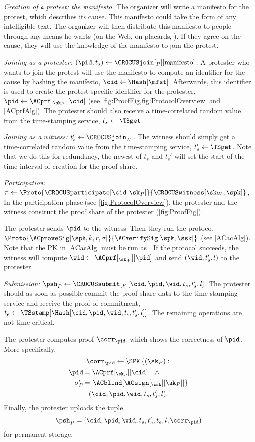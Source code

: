\emph{Creation of a protest: the manifesto.}
The organizer will write a manifesto for the protest, which describes its cause.
This manifesto could take the form of any intelligible text.
The organizer will then distribute this manifesto to people through any means he wants (\eg on the Web, on placards, \etc).
If they agree on the cause, they will use the knowledge of the manifesto to join the protest.


\emph{Joining as a protester: \((\pid, t_s)\gets 
    \CROCUSjoin[_P][\text{manifesto}]\).}
A protester who wants to join the protest will use the manifesto to compute an identifier for the cause by hashing the manifesto, \(\cid\gets \Hash[\mfst]\).
Afterwards, this identifier is used to create the protest-specific identifier 
for the protester, \(\pid\gets \ACprf[_{\sk_P}][\cid]\) (see 
\cref{fig:ProofFig,fig:ProtocolOverview} and \cref{ACprfAlg}).
The protester should also receive a time-correlated random value from the 
time-stamping service, \(t_s\gets \TSget\).


\emph{Joining as a witness: \(t_s'\gets \CROCUSjoin_W\).}
The witness should simply get a time-correlated random value from the time-stamping service, \(t_s'\gets \TSget\).
Note that we do this for redundancy, the newest of \(t_s\) and \(t_s'\) will 
set the start of the time interval of creation for the proof share.


\emph{Participation: \(\pi\gets
    \Proto{\CROCUSparticipate[\cid, \sk_P]}{\CROCUSwitness[\sk_W, \spk]}\),}
In the participation phase (see \cref{fig:ProtocolOverview}), the protester and 
the witness construct the proof share of the protester (\cref{fig:ProofFig}).

The protester sends \(\pid\) to the witness.
Then they run the protocol \(\Proto{\ACproveSig[\spk, k, r, 
    \sigma]}{\ACverifySig[\spk, \ssk]}\) (see \cref{ACacAlg}).
Note that the \ac{PK} in \cref{ACacAlg} must be run as .
If the protocol succeeds, the witness will compute \(\wid \gets 
  \ACprf[_{\sk_W}][\pid]\) and send \((\wid, t_s', l)\) to the protester.


\emph{Submission: \(\psh_P\gets \CROCUSsubmit[_P][\cid, \pid, \wid, t_s, t_s',  l]\).}
The protester should as soon as possible commit the proof-share data to the 
time-stamping service and receive the proof of commitment, \(t_e\gets 
  \TSstamp[\Hash[\cid, \pid, \wid, t_s, t_s', l]]\).
The remaining operations are not time critical.

The protester computes  proof \(\corr_{\pid}\), which shows the 
correctness of \(\pid\).
More specifically,
\begin{multline*}
  \corr_{\pid}\gets \SPK\left\{ (\sk_P) : \right. \\
    \begin{aligned}
      \pid &= \ACprf[_{\sk_P}][\cid] \quad \land \\
      \sigma_P' &= \left. \ACblind[\ACsign[_{\ssk}][\sk_P]] \right\}
    \end{aligned} \\
      (\cid, \pid, \wid, t_s, t_s', l).
\end{multline*}
Finally, the protester uploads the tuple \[
  \psh_P = (\cid, \pid, \wid, t_s, t_s', t_e, l, \corr_{\pid})
\] for permanent storage.

